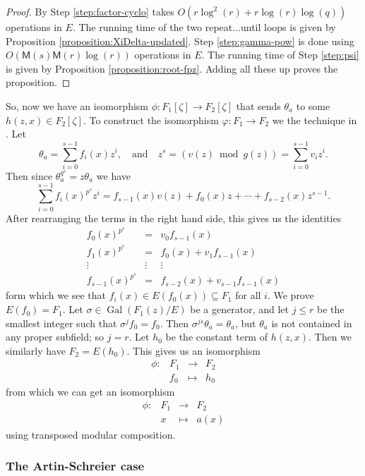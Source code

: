\documentclass[12pt]{article}
\theoremstyle{plain}
\theoremstyle{definition}
\DeclareMathOperator{\gal}{Gal} %
\def\MM{\ensuremath{\mathsf{M}}}
\begin{document}
\begin{proof}
	By \cite[Theorem 9]{shoup94} Step \ref{step:factor-cyclo} takes $O(r\log^2(r) + 
	r\log(r)\log(q))$ operations in $E$. The running time of the two repeat...until loops is 
	given by Proposition \ref{proposition:XiDelta-updated}. Step \ref{step:gamma-pow}
	is done using $O(\MM(s)\MM(r)\log(r))$ operations in $E$. The running time of Step 
	\ref{step:psi} is given by Proposition \ref{proposition:root-fpz}. Adding all these up proves 
	the proposition.
\end{proof}
So, now we have an isomorphism $\phi: F_1[\zeta] \rightarrow F_2[\zeta]$ that sends $\theta_a$ to 
some $h(z, x) \in F_2[\zeta]$. To construct the isomorphism $\varphi: F_1 \rightarrow F_2$ we the 
technique in \cite{Allombert02}. Let 
\[ \theta_a = \sum_{i = 0}^{s - 1}f_i(x)z^i, \quad\text{and}\quad z^s = (v(z)  \bmod g(z)) = 
\sum_{i = 0}^{s - 1}v_iz^i. \] 
Then since $\theta_a^{q^s} = z\theta_a$ we have
\[ \sum_{i = 0}^{s - 1}f_i(x)^{p^s}z^i = f_{s - 1}(x)v(z) + f_0(x)z + \cdots + f_{s - 2}(x)z^{s - 
1}.\]
After rearranging the terms in the right hand side, this gives us the identities
\[
\begin{array}{ccc}
	f_0(x)^{p^s} & = & v_0f_{s - 1}(x) \\
	f_1(x)^{p^s} & = & f_0(x) + v_1f_{s - 1}(x) \\
	\vdots & \vdots & \vdots \\
	f_{s - 1}(x)^{p^s} & = & f_{s - 2}(x) + v_{s - 1}f_{s - 1}(x)
\end{array} 
\]
form which we see that $f_i(x) \in E(f_0(x)) \subseteq F_1$ for all $i$. We prove $E(f_0) = 
F_1$. Let $\sigma \in \gal(F_1(z) / E)$ be a generator, and let $j \le r$ be the smallest 
integer such that $\sigma^jf_0 = f_0$. Then $\sigma^{js}\theta_a = \theta_a$, but $\theta_a$ is not 
contained in any proper subfield; so $j = r$. Let $h_0$ be the constant term of $h(z, x)$. Then we 
similarly have $F_2 = E(h_0)$. This gives us an isomorphism
\[
\begin{array}{rlll}
	\phi: & F_1 & \longrightarrow & F_2 \\
	& f_0 & \longmapsto & h_0
\end{array}
\]
from which we can get an isomorphism
\[
\begin{array}{rlll}
	\phi: & F_1 & \longrightarrow & F_2 \\
	& x & \longmapsto & a(x)
\end{array}
\]
using transposed modular composition.

\subsubsection{The Artin-Schreier case}
\label{sec:artin-schreier-case}
\end{document}
